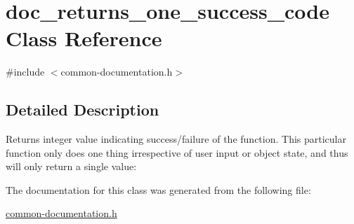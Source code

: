 \hypertarget{classdoc__returns__one__success__code}{}\section{doc\+\_\+returns\+\_\+one\+\_\+success\+\_\+code Class Reference}
\label{classdoc__returns__one__success__code}


{\ttfamily \#include $<$common-\/documentation.\+h$>$}



\subsection{Detailed Description}
\begin{DoxyReturn}{Returns}
integer value indicating success/failure of the function. This particular function only does one thing irrespective of user input or object state, and thus will only return a single value\+: 
\end{DoxyReturn}


The documentation for this class was generated from the following file\+:\begin{DoxyCompactItemize}
\item 
\hyperlink{common-documentation_8h}{common-\/documentation.\+h}\end{DoxyCompactItemize}

